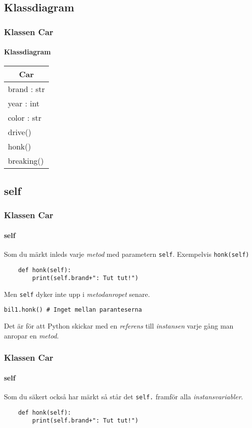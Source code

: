 \documentclass[aspectratio=169]{beamer}
\begin{document}
\subsection{Klassdiagram}

\begin{frame}
	\frametitle{Klassen Car}
	\framesubtitle{Klassdiagram}
	
	\centering
	\begin{tabular}{|l|}
		\hline
		\multicolumn{1}{|c|}{\textbf{Car}} \\
		\hline
		brand : str\\
		year : int\\
		color : str\\ \hline
		drive() \\
		honk() \\
		breaking() \\ \hline
	\end{tabular}

\end{frame}

\subsection{self}

\begin{frame}[fragile]
	\frametitle{Klassen Car}
	\framesubtitle{self}
	
	Som du märkt inleds varje \textit{metod} med parametern \texttt{self}. Exempelvis \texttt{honk(self)}
	
	\begin{lstlisting}
    def honk(self):
        print(self.brand+": Tut tut!")
	\end{lstlisting}
	
	Men \texttt{self} dyker inte upp i \textit{metodanropet} senare.
	
	\begin{lstlisting}
bil1.honk() # Inget mellan paranteserna
	\end{lstlisting}
	
	Det är för att Python skickar med en \textit{referens} till \textit{instansen} varje gång man anropar en \textit{metod}.

\end{frame}

\begin{frame}[fragile]
	\frametitle{Klassen Car}
	\framesubtitle{self}
	
	Som du säkert också har märkt så står det \texttt{self.} framför alla \textit{instansvariabler}.
	
	\begin{lstlisting}
    def honk(self):
        print(self.brand+": Tut tut!")
	\end{lstlisting}

\end{frame}
\end{document}
